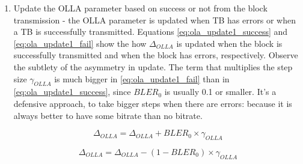 \begin{enumerate}
    \item Update the \acs{OLLA} parameter based on success or not from the block transmission - the OLLA parameter is updated when \ac{TB} has errors or when a TB is successfully transmitted. Equations \eqref{eq:ola_update1_success} and \eqref{eq:ola_update1_fail} show the how $\Delta_{OLLA}$ is updated when the block is successfully transmitted and when the block has errors, respectively. Observe the subtlety of the asymmetry in update. The term that multiplies the step size $\gamma_{OLLA}$ is much bigger in \eqref{eq:ola_update1_fail} than in \eqref{eq:ola_update1_success}, since $BLER_0$ is usually 0.1 or smaller. It's a defensive approach, to take bigger steps when there are errors: because it is always better to have some bitrate than no bitrate.
    

    \begin{equation} \label{eq:ola_update1_success}
        \Delta_{OLLA} = \Delta_{OLLA} + BLER_0 \times \gamma_{OLLA}
    \end{equation}

    \begin{equation} \label{eq:ola_update1_fail}
        \Delta_{OLLA} = \Delta_{OLLA} - (1 - BLER_0) \times \gamma_{OLLA}
    \end{equation}
\end{enumerate}





